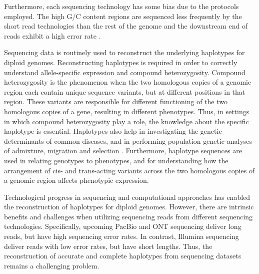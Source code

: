 Furthermore, each sequencing technology has some bias due to the protocols employed.
The high G/C content regions are sequenced less frequently by the short read technologies than the rest of the genome and the downstream end of reads exhibit a high error rate \citep{aird2011analyzing, dohm2008substantial}.

Sequencing data is routinely used to reconstruct the underlying haplotypes for diploid genomes. Reconstructing haplotypes is required in order to correctly understand allele-specific expression and compound heterozygosity. 
Compound heterozygosity is the phenomenon when the two homologous copies of a genomic region each contain unique sequence variants, 
but at different positions in that region. These variants are responsible for different functioning of the two homologous copies of a gene, resulting in different phenotypes.
Thus, in settings in which compound heterozygosity play a role, the knowledge about the specific haplotype is essential.
Haplotypes also help in investigating the genetic determinants of common diseases, and in performing population-genetic analyses of admixture, migration and selection \citep{tewhey2011importance, Glusman2014}. 
Furthermore, haplotype sequences are used in relating genotypes to phenotypes, and for understanding how the arrangement of cis- and trans-acting variants across the two homologous copies of a genomic region affects phenotypic expression.

Technological progress in sequencing and computational approaches has enabled the reconstruction of haplotypes for diploid genomes.
However, there are intrinsic benefits and challenges when utilizing sequencing reads from different sequencing technologies. 
Specifically, upcoming PacBio and ONT sequencing deliver long reads, but have high sequencing error rates.
In contrast, Illumina sequencing deliver reads with low error rates, but have short lengths.
Thus, the reconstruction of accurate and complete haplotypes from sequencing datasets remains a challenging problem.

